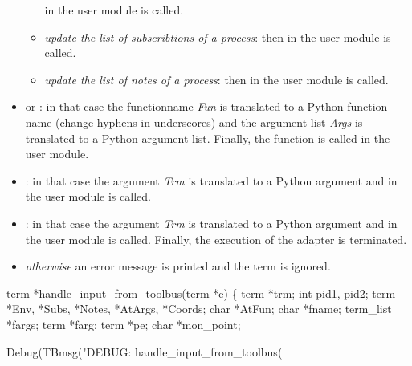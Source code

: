 \begin{itemize}
\begin{itemize}
     in the user module is called.
  \item \emph{update the list of subscribtions of a process}: then 
     in the user
    module is called.
  \item \emph{update the list of notes of a process}: then 
     in the user
    module is called.
  \end{itemize}
\item {} or
  : in that case the
  functionname \emph{Fun} is translated to a Python function name
  (change hyphens in underscores) and the argument list \emph{Args} is
  translated to a Python argument list. Finally, the function is
  called in the user module.
\item {}: in that case the argument
  \emph{Trm} is translated to a Python argument and
   in the user module is called.
\item {}: in that case the argument
  \emph{Trm} is translated to a Python argument and
   in the user module is called.  Finally, the
  execution of the adapter is terminated.
\item \emph{otherwise} an error message is printed and the term is
  ignored.
\end{itemize}
\nwenddocs{}\plusendmoddef\nwstartdeflinemarkup{}\nwenddeflinemarkup
term *handle_input_from_toolbus(term *e) \{
  term *trm;  
  int pid1, pid2;
  term *Env, *Subs, *Notes, *AtArgs, *Coords;
  char *AtFun;
  char *fname;
  term_list *fargs;
  term *farg;
  term *pe;
  char *mon_point;

  Debug(TBmsg("DEBUG: handle_input_from_toolbus(%


